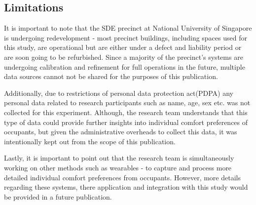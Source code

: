 \documentclass[]{interact}
\theoremstyle{plain}%
\theoremstyle{definition}
\theoremstyle{remark}
\begin{document}

\subsection{Limitations}
It is important to note that the SDE precinct at National University of Singapore is undergoing redevelopment - most precinct buildings, including spaces used for this study, are operational but are either under a defect and liability period or are soon going to be refurbished. Since a majority of the precinct's systems are undergoing calibration and refinement for full operations in the future, multiple data sources cannot not be shared for the purposes of this publication.

Additionally, due to restrictions of personal data protection act(PDPA) any personal data related to research participants such as name, age, sex etc. was not collected for this experiment. Although, the research team understands that this type of data could provide further insights into individual comfort preferences of occupants, but given the administrative overheads to collect this data, it was intentionally kept out from the scope of this publication.         

Lastly, it is important to point out that the research team is simultaneously working on other methods such as wearables - to capture and process more detailed individual comfort preferences from occupants. However, more details regarding these systems, there application and integration with this study would be provided in a future publication.   

\end{document}

